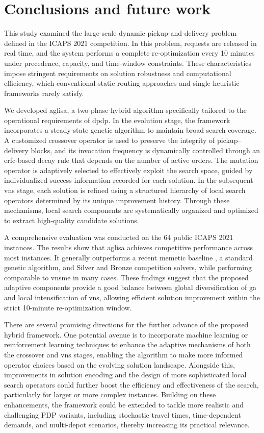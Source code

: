 \documentclass[preprint,12pt]{elsarticle}
\begin{document}
\section{Conclusions and future work} \label{sec:con}

This study examined the large-scale dynamic pickup-and-delivery problem defined in the ICAPS 2021 competition. In this problem, requests are released in real time, and the system performs a complete re-optimization every 10 minutes under precedence, capacity, and time-window constraints. These characteristics impose stringent requirements on solution robustness and computational efficiency, which conventional static routing approaches and single-heuristic frameworks rarely satisfy.

We developed \gls{aglisa}, a two-phase hybrid algorithm specifically tailored to the operational requirements of \gls{dpdp}. In the evolution stage, the framework incorporates a steady-state genetic algorithm to maintain broad search coverage. A customized crossover operator is used to preserve the integrity of pickup–delivery blocks, and its invocation frequency is dynamically controlled through an erfc-based decay rule that depends on the number of active orders. The mutation operator is adaptively selected to effectively exploit the search space, guided by individualized success information recorded for each solution. In the subsequent \gls{vns} stage, each solution is refined using a structured hierarchy of local search operators determined by its unique improvement history. Through these mechanisms, local search components are systematically organized and optimized to extract high-quality candidate solutions.

A comprehensive evaluation was conducted on the 64 public ICAPS 2021 instances. The results show that \gls{aglisa} achieves competitive performance across most instances. It generally outperforms a recent memetic baseline \cite{zhou2024memetic}, a standard genetic algorithm, and Silver and Bronze competition solvers, while performing comparable to \gls{vnsme} \cite{cai2022variable} in many cases. These findings suggest that the proposed adaptive components provide a good balance between global diversification of \gls{ga} and local intensification of \gls{vns}, allowing efficient solution improvement within the strict 10-minute re-optimization window.

There are several promising directions for the further advance of the proposed hybrid framework. One potential avenue is to incorporate machine learning or reinforcement learning techniques to enhance the adaptive mechanisms of both the crossover and \gls{vns} stages, enabling the algorithm to make more informed operator choices based on the evolving solution landscape. Alongside this, improvements in solution encoding and the design of more sophisticated local search operators could further boost the efficiency and effectiveness of the search, particularly for larger or more complex instances. Building on these enhancements, the framework could be extended to tackle more realistic and challenging PDP variants, including stochastic travel times, time-dependent demands, and multi-depot scenarios, thereby increasing its practical relevance.


\end{document}
